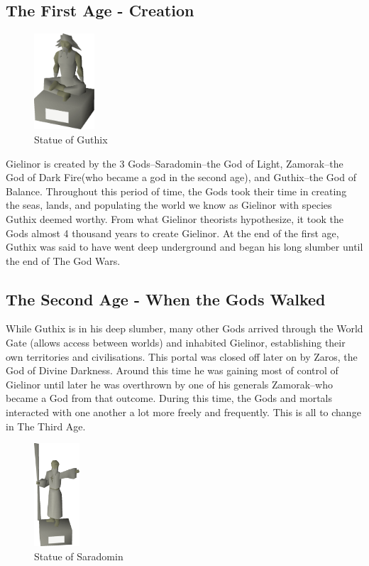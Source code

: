 \documentclass{article}
\begin{document}
\vspace{2mm}
\subsection{The First Age - Creation}
\begin{figure}
\includegraphics[width=0.2\textwidth,right]{guthix.png}
\caption*{\label{fig:guth}\small Statue of Guthix}
\end{figure}
\normalsize Gielinor is created by the 3 Gods--Saradomin--the God of Light, Zamorak--the God of Dark Fire(who became a god in the second age), and Guthix--the God of Balance. Throughout this period of time, the Gods took their time in creating the seas, lands, and populating the world we know as Gielinor with species Guthix deemed worthy. From what Gielinor theorists hypothesize, it took the Gods almost 4 thousand years to create Gielinor. At the end of the first age, Guthix was said to have went deep underground and began his long slumber until the end of The God Wars. 

\vspace{6mm}
\subsection{The Second Age - When the Gods Walked}
While Guthix is in his deep slumber, many other Gods arrived through the World Gate (allows access between worlds) and inhabited Gielinor, establishing their own territories and civilisations. This portal was closed off later on by Zaros, the God of Divine Darkness. Around this time he was gaining most of control of Gielinor until later he was overthrown by one of his generals Zamorak--who became a God from that outcome. During this time, the Gods and mortals interacted with one another a lot more freely and frequently. This is all to change in The Third Age.
\begin{figure}[h]
    \centering
    \includegraphics[width=0.15\textwidth]{saradomin.png}
    \caption*{Statue of Saradomin}
    \label{fig:sara}
\end{figure}
\end{document}
